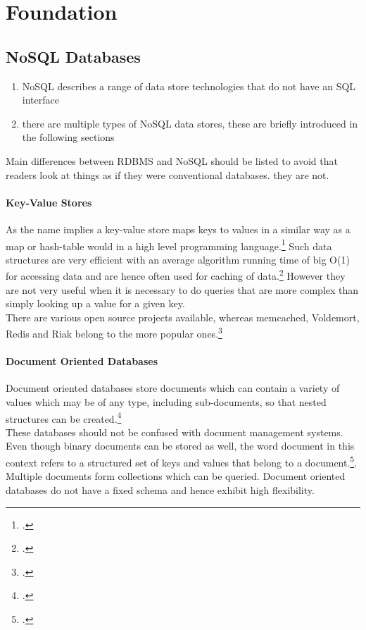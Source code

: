 \section{Foundation}
\label{sec:foundation}



\subsection{NoSQL Databases}
\label{sec:nosql}

\begin{enumerate}
  \item NoSQL describes a range of data store technologies that do not have an SQL interface
  \item there are multiple types of NoSQL data stores, these are briefly introduced in the following sections
\end{enumerate}
Main differences between RDBMS and NoSQL should be listed to avoid that readers
look at things as if they were conventional databases. they are not.

\paragraph{Key-Value Stores}
\label{sec:nosql-key-value}
As the name implies a key-value store maps keys to values in a similar way as a
map or hash-table would in a high level programming
language.\footcite[Cf.][4]{Redmond_2012} Such data structures are very efficient
with an average algorithm running time of big O(1) for accessing data and
are hence often used for caching of data.\footcite[Cf.][p. 14 et sq.]{Tiwari_2011}
However they are not very useful when it is necessary to do queries that are
more complex than simply looking up a value for a given key.\\
There are various open source projects available, whereas memcached, Voldemort,
Redis and Riak belong to the more popular ones.\footcite[Cf.][4]{Redmond_2012}

 
\paragraph{Document Oriented Databases}
\label{sec:nosql-document}
Document oriented databases store documents which can contain a variety of
values which may be of any type, including sub-documents, so that nested 
structures can be created.\footcite[Cf.][p. 5 et sq.]{Redmond_2012}\\
These databases should not be confused with document management systems. Even
though binary documents can be stored as well, the word document in this context
refers to a structured set of keys and values that belong to a
document.\footcite[Cf.][p. 18 et sq.]{Tiwari_2011}.\\
Multiple documents form collections which can be queried. Document oriented
databases do not have a fixed schema and hence exhibit high flexibility.

